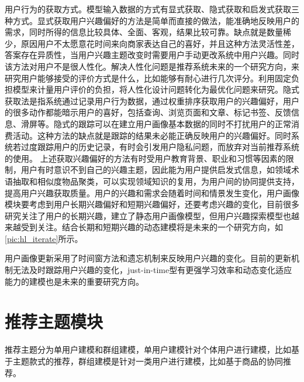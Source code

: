   用户行为的获取方式。模型输入数据的方式有显式获取、隐式获取和启发式获取三种方式。显式获取用户兴趣偏好的方法是简单而直接的做法，能准确地反映用户的需求，同时所得的信息比较具体、全面、客观，结果比较可靠。缺点就是数量稀少，原因用户不太愿意花时间来向商家表达自己的喜好，并且这种方法灵活性差，答案存在异质性，当用户兴趣主题改变时需要用户手动更改系统中用户兴趣。同时该方法对用户不是很人性化。解决人性化问题是推荐系统未来的一个研究方向，来研究用户能够接受的评价方式是什么，比如能够有耐心进行几次评分。利用固定负担模型来计量用户评价的负担，将人性化设计问题转化为最优化问题来研究。隐式获取法是指系统通过记录用户行为数据，通过权重排序获取用户的兴趣偏好，用户的很多动作都能暗示用户的喜好，包括查询、浏览页面和文章、标记书签、反馈信息、滑屏等。隐式的跟踪可以在建立用户画像基本数据的同时不打扰用户的正常消费活动。这种方法的缺点就是跟踪的结果未必能正确反映用户的兴趣偏好。同时系统若过度跟踪用户的历史记录，有时会引发用户隐私问题，而放弃对当前推荐系统的使用。 上述获取兴趣偏好的方法有时受用户教育背景、职业和习惯等因素的限制，用户有时意识不到自己的兴趣主题，因此能为用户提供启发式信息，如领域术语抽取和相似度物品聚类，可以实现领域知识的复用，为用户间的协同提供支持，提高用户兴趣获取质量。用户的兴趣和需求会随着时间和情景发生变化，用户画像模块要考虑到用户长期兴趣偏好和短期兴趣偏好，还要考虑兴趣的变化，目前很多研究关注了用户的长期兴趣，建立了静态用户画像模型，但用户兴趣探索模型也越来越受到关注。结合长期和短期兴趣的动态建模将是未来的一个研究方向，如\autoref{pic:hl_iterate}所示。
  \begin{figure}
    \centering
      \label{pic:hl_iterate}
  \end{figure}

  用户画像更新采用了时间窗方法和遗忘机制来反映用户兴趣的变化。目前的更新机制无法及时跟踪用户兴趣的变化，just-in-time型有更强学习效率和动态变化适应能力的建模也是未来的重要研究方向。 

  \section{推荐主题模块}
  推荐主题分为单用户建模和群组建模，单用户建模针对个体用户进行建模，比如基于主题款式的推荐，群组建模是针对一类用户进行建模，比如基于商品的协同推荐。

